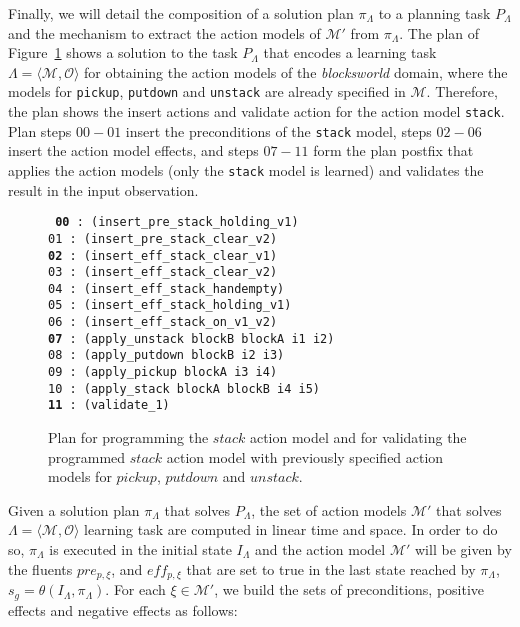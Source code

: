 \documentclass[runningheads]{llncs}
\newcommand{\tup}[1]{{\langle #1 \rangle}}
\begin{document}
Finally, we will detail the composition of a solution plan $\pi_\Lambda$ to a planning task $P_\Lambda$ and the mechanism to extract the action models of $\mathcal{M}'$ from $\pi_\Lambda$. The plan of Figure~\ref{fig:plan-lplan} shows a solution to the task $P_{\Lambda}$ that encodes a learning task $\Lambda=\tup{\mathcal{M},\mathcal{O}}$ for obtaining the action models of the {\em blocksworld} domain, where the models for {\tt\small pickup}, {\tt\small putdown} and {\tt\small unstack} are already specified in $\mathcal{M}$. Therefore, the plan shows the insert actions and validate action for the action model {\tt\small stack}. Plan steps $00-01$ insert the preconditions of the {\tt\small stack} model, steps $02-06$ insert the action model effects, and steps $07-11$ form the plan postfix that applies the action models (only the {\tt\small stack} model is learned) and validates the result in the input observation.

\begin{figure}[hbt!]
	{\footnotesize\tt
		{\bf 00} : (insert\_pre\_stack\_holding\_v1) \\
		01 : (insert\_pre\_stack\_clear\_v2)\\
		{\bf 02} : (insert\_eff\_stack\_clear\_v1)\\
		03 : (insert\_eff\_stack\_clear\_v2)\\
		04 : (insert\_eff\_stack\_handempty)\\
		05 : (insert\_eff\_stack\_holding\_v1)\\
		06 : (insert\_eff\_stack\_on\_v1\_v2)\\
		{\bf 07} : (apply\_unstack blockB blockA i1 i2)\\
		08 : (apply\_putdown blockB i2 i3)\\
		09 : (apply\_pickup blockA i3 i4)\\
		10 : (apply\_stack blockA blockB i4 i5)\\
		{\bf 11} : (validate\_1)
	}
	\caption{\small Plan for programming the $stack$ action model and for validating the programmed $stack$ action model with previously specified action models for $pickup$, $putdown$ and $unstack$.}
	\label{fig:plan-lplan}
\end{figure}

Given a solution plan $\pi_\Lambda$ that solves $P_{\Lambda}$, the set of action models $\mathcal{M}'$ that solves $\Lambda=\tup{\mathcal{M},\mathcal{O}}$ learning task are computed in linear time and space. In order to do so, $\pi_\Lambda$ is executed in the initial state $I_{\Lambda}$ and the action model $\mathcal{M}'$ will be given by the fluents $pre_{p,\xi}$, and $eff_{p,\xi}$ that are set to true in the last state reached by $\pi_\Lambda$, $s_g=\theta(I_\Lambda,\pi_\Lambda)$. For each $\xi \in \mathcal{M'}$, we build the sets of preconditions, positive effects and negative effects as follows:
\end{document}
